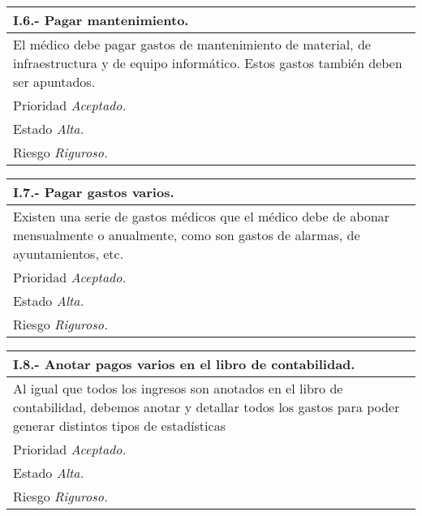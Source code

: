 	\begin{center}
	\begin{tabulary}{15cm}{|L|}
		\hline
			\bf{I.6.- Pagar mantenimiento.} \\
		\hline
			El médico debe pagar gastos de mantenimiento de material, de infraestructura y de equipo informático. Estos gastos también deben ser apuntados. \\
		\hline
			Prioridad \textit{Aceptado.} \\
		\hline
			Estado \textit{Alta.} \\
		\hline
			Riesgo \textit{Riguroso.} \\
		\hline
	\end{tabulary}
	\end{center}

	\begin{center}
	\begin{tabulary}{15cm}{|L|}
		\hline
			\bf{I.7.- Pagar gastos varios.} \\
		\hline
			Existen una serie de gastos médicos que el médico debe de abonar mensualmente o anualmente, como son gastos de alarmas, de ayuntamientos, etc. \\
		\hline
			Prioridad \textit{Aceptado.} \\
		\hline
			Estado \textit{Alta.} \\
		\hline
			Riesgo \textit{Riguroso.} \\
		\hline
	\end{tabulary}
	\end{center}

	\begin{center}
	\begin{tabulary}{15cm}{|L|}
		\hline
			\bf{I.8.- Anotar pagos varios en el libro de contabilidad.} \\
		\hline
			Al igual que todos los ingresos son anotados en el libro de contabilidad, debemos anotar y detallar todos los gastos para poder generar distintos tipos de estadísticas\\
		\hline
			Prioridad \textit{Aceptado.} \\
		\hline
			Estado \textit{Alta.} \\
		\hline
			Riesgo \textit{Riguroso.} \\
		\hline
	\end{tabulary}
	\end{center}


